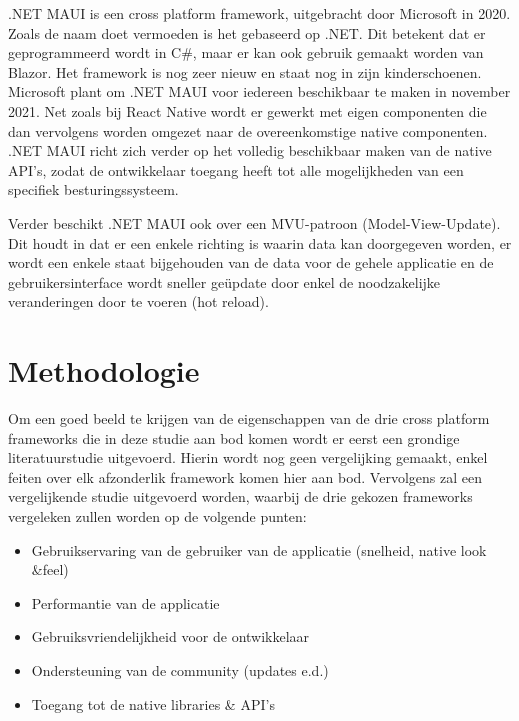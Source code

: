 .NET MAUI is een cross platform framework, uitgebracht door Microsoft in 2020. Zoals de naam doet vermoeden is het gebaseerd op .NET. Dit betekent dat er geprogrammeerd wordt in C\#, maar er kan ook gebruik gemaakt worden van Blazor. Het framework is nog zeer nieuw en staat nog in zijn kinderschoenen. Microsoft plant om .NET MAUI voor iedereen beschikbaar te maken in november 2021. Net zoals bij React Native wordt er gewerkt met eigen componenten die dan vervolgens worden omgezet naar de overeenkomstige native componenten. .NET MAUI richt zich verder op het volledig beschikbaar maken van de native API's, zodat de ontwikkelaar toegang heeft tot alle mogelijkheden van een specifiek besturingssysteem. 

Verder beschikt .NET MAUI ook over een MVU-patroon (Model-View-Update). Dit houdt in dat er een enkele richting is waarin data kan doorgegeven worden, er wordt een enkele staat bijgehouden van de data voor de gehele applicatie en de gebruikersinterface wordt sneller geüpdate door enkel de noodzakelijke veranderingen door te voeren (hot reload).


\section{Methodologie}
\label{sec:methodologie}

Om een goed beeld te krijgen van de eigenschappen van de drie cross platform frameworks die in deze studie aan bod komen wordt er eerst een grondige literatuurstudie uitgevoerd. Hierin wordt nog geen vergelijking gemaakt, enkel feiten over elk afzonderlik framework komen hier aan bod. Vervolgens zal een vergelijkende studie uitgevoerd worden, waarbij de drie gekozen frameworks vergeleken zullen worden op de volgende punten: 

\begin{itemize}
    \item Gebruikservaring van de gebruiker van de applicatie (snelheid, native look \&feel)
    \item Performantie van de applicatie
    \item Gebruiksvriendelijkheid voor de ontwikkelaar
    \item Ondersteuning van de community (updates e.d.)
    \item Toegang tot de native libraries \& API's
\end{itemize}

